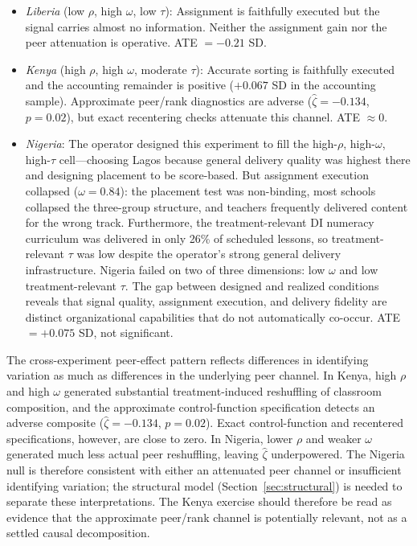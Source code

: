 \documentclass[11pt]{article}
\begin{document}
\begin{itemize}
\item \emph{Liberia} (low $\rho$, high $\omega$, low $\tau$): Assignment is faithfully executed but the signal carries almost no information. Neither the assignment gain nor the peer attenuation is operative. ATE $= -0.21$ SD.

\item \emph{Kenya} (high $\rho$, high $\omega$, moderate $\tau$): Accurate sorting is faithfully executed and the accounting remainder is positive ($+0.067$ SD in the accounting sample). Approximate peer/rank diagnostics are adverse ($\hat{\zeta} = -0.134$, $p = 0.02$), but exact recentering checks attenuate this channel. ATE $\approx 0$.

\item \emph{Nigeria}: The operator designed this experiment to fill the high-$\rho$, high-$\omega$, high-$\tau$ cell---choosing Lagos because general delivery quality was highest there and designing placement to be score-based. But assignment execution collapsed ($\omega = 0.84$): the placement test was non-binding, most schools collapsed the three-group structure, and teachers frequently delivered content for the wrong track. Furthermore, the treatment-relevant DI numeracy curriculum was delivered in only 26\% of scheduled lessons, so treatment-relevant $\tau$ was low despite the operator's strong general delivery infrastructure. Nigeria failed on two of three dimensions: low $\omega$ and low treatment-relevant $\tau$. The gap between designed and realized conditions reveals that signal quality, assignment execution, and delivery fidelity are distinct organizational capabilities that do not automatically co-occur. ATE $= +0.075$ SD, not significant.
\end{itemize}

The cross-experiment peer-effect pattern reflects differences in identifying variation as much as differences in the underlying peer channel. In Kenya, high $\rho$ and high $\omega$ generated substantial treatment-induced reshuffling of classroom composition, and the approximate control-function specification detects an adverse composite ($\hat{\zeta} = -0.134$, $p = 0.02$). Exact control-function and recentered specifications, however, are close to zero. In Nigeria, lower $\rho$ and weaker $\omega$ generated much less actual peer reshuffling, leaving $\hat{\zeta}$ underpowered. The Nigeria null is therefore consistent with either an attenuated peer channel or insufficient identifying variation; the structural model (Section~\ref{sec:structural}) is needed to separate these interpretations. The Kenya exercise should therefore be read as evidence that the approximate peer/rank channel is potentially relevant, not as a settled causal decomposition.
\end{document}
